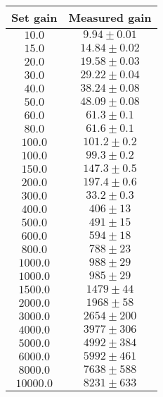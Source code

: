 \begin{table}[H]
	\renewcommand{\arraystretch}{1}
	\centering
	\large
		\begin{tabular}{|c|c|}
			\hline
			Set gain & Measured gain \\
			\hline
			$10.0$ & $9.94 \pm 0.01$ \\
			\hline
			$15.0$ & $14.84 \pm 0.02$ \\
			\hline
			$20.0$ & $19.58 \pm 0.03$ \\
			\hline
			$30.0$ & $29.22 \pm 0.04$ \\
			\hline
			$40.0$ & $38.24 \pm 0.08$ \\
			\hline
			$50.0$ & $48.09 \pm 0.08$ \\
			\hline
			$60.0$ & $61.3 \pm 0.1$ \\
			\hline
			$80.0$ & $61.6 \pm 0.1$ \\
			\hline
			$100.0$ & $101.2 \pm 0.2$ \\
			\hline
			$100.0$ & $99.3 \pm 0.2$ \\
			\hline
			$150.0$ & $147.3 \pm 0.5$ \\
			\hline
			$200.0$ & $197.4 \pm 0.6$ \\
			\hline
			$300.0$ & $33.2 \pm 0.3$ \\
			\hline
			$400.0$ & $406 \pm 13$ \\
			\hline
			$500.0$ & $491 \pm 15$ \\
			\hline
			$600.0$ & $594 \pm 18$ \\
			\hline
			$800.0$ & $788 \pm 23$ \\
			\hline
			$1000.0$ & $988 \pm 29$ \\
			\hline
			$1000.0$ & $985 \pm 29$ \\
			\hline
			$1500.0$ & $1479 \pm 44$ \\
			\hline
			$2000.0$ & $1968 \pm 58$ \\ 
			$3000.0$ & $2654 \pm 200$ \\
			\hline
			$4000.0$ & $3977 \pm 306$ \\
			\hline
			$5000.0$ & $4992 \pm 384$ \\
			\hline
			$6000.0$ & $5992 \pm 461$ \\
			\hline
			$8000.0$ & $7638 \pm 588$ \\
			\hline
			$10000.0$ & $8231 \pm 633$ \\
			\hline
		\end{tabular}
	\caption{ }
	\label{tab:gains }
\end{table}


